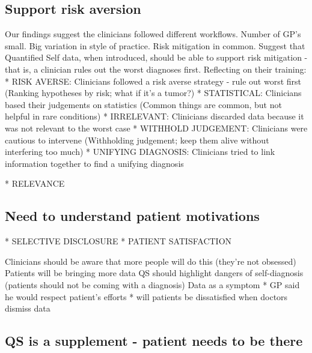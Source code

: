 \documentclass{sigchi}
\begin{document}
\subsection{Support risk aversion} %


Our findings suggest the clinicians followed different workflows. Number of GP's small. Big variation in style of practice. Risk mitigation in common. 
Suggest that Quantified Self data, when introduced, should be able to support risk mitigation - that is, a clinician rules out the worst diagnoses first.
Reflecting on their training:
* RISK AVERSE: Clinicians followed a risk averse strategy - rule out worst first (Ranking hypotheses by risk; what if it's a tumor?)
* STATISTICAL: Clinicians based their judgements on statistics (Common things are common, but not helpful in rare conditions)
* IRRELEVANT: Clinicians discarded data because it was not relevant to the worst case
* WITHHOLD JUDGEMENT: Clinicians were cautious to intervene (Withholding judgement; keep them alive without interfering too much)
* UNIFYING DIAGNOSIS: Clinicians tried to link information together to find a unifying diagnosis


* RELEVANCE





\subsection{Need to understand patient motivations}



* SELECTIVE DISCLOSURE
* PATIENT SATISFACTION



Clinicians should be aware that more people will do this (they're not obsessed)
Patients will be bringing more data
QS should highlight dangers of self-diagnosis (patients should not be coming with a diagnosis)
Data as a symptom
* GP said he would respect patient's efforts
* will patients be dissatisfied when doctors dismiss data

\subsection{QS is a supplement - patient needs to be there}
\end{document}
